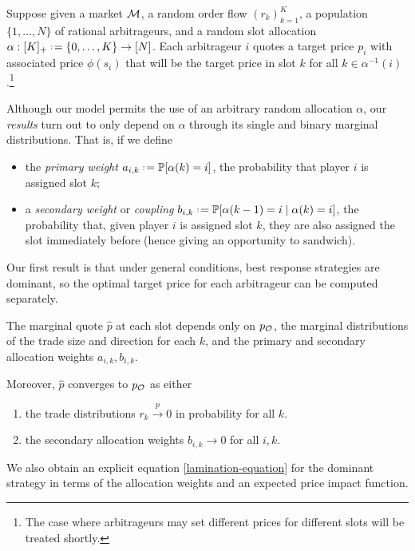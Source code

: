 Suppose given a market $\mathcal{M}$, a random order flow $(r_k)_{k=1}^K$, a population $\{1,\ldots,N\}$ of rational arbitrageurs, and a random slot allocation $\alpha:[K]_+\defeq\{0,\ldots,K\}\rightarrow[N]$.
%
Each arbitrageur $i$ quotes a target price $p_i$ with associated price $\phi(s_i)$ that will be the target price in slot $k$ for all $k\in\alpha^{-1}(i)$.\footnote{The case where arbitrageurs may set different prices for different slots will be treated shortly.}

Although our model permits the use of an arbitrary random allocation $\alpha$, our \emph{results} turn out to only depend on $\alpha$ through its single and binary marginal distributions.
%
That is, if we define
\begin{itemize}
  \item the \emph{primary weight} $a_{i,k} \defeq \Probability[\alpha(k)=i]$, the probability that player $i$ is assigned slot $k$;
  \item a \emph{secondary weight} or \emph{coupling} $b_{i,k} \defeq \Probability[\alpha(k-1)=i \mid \alpha(k)=i]$, the probability that, given player $i$ is assigned slot $k$, they are also assigned the slot immediately before (hence giving an opportunity to sandwich).
\end{itemize}

Our first result is that under general conditions, best response strategies are dominant, so the optimal target price for each arbitrageur can be computed separately.

\begin{theorem}

  The marginal quote $\hat{p}$ at each slot depends only on $p_{\mathcal{O}}$, the marginal distributions of the trade size and direction for each $k$, and the primary and secondary allocation weights $a_{i,k},b_{i,k}$.
  
  Moreover, $\hat{p}$ converges to $p_{\mathcal{O}}$ as either
  \begin{enumerate}
    \item the trade distributions $r_k\stackrel{p}{\rightarrow}0$ in probability for all $k$.
    \item the secondary allocation weights $b_{i,k}\rightarrow 0$ for all $i,k$.
  \end{enumerate}

\end{theorem}

We also obtain an explicit equation \eqref{lamination-equation} for the dominant strategy in terms of the allocation weights and an expected price impact function.

